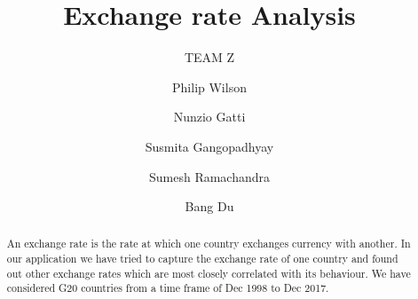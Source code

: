\documentclass[acmtog,authorversion]{acmart}
\begin{document}
\title{Exchange rate Analysis} 

 \subtitle{TEAM Z}


\author{Philip Wilson}

\author{Nunzio Gatti}

\author{Susmita Gangopadhyay} 

\author{Sumesh Ramachandra}

\author{Bang Du}



\begin{abstract}
An exchange rate is the rate at which one country exchanges currency with another.  In our application we have tried to capture the exchange rate of one country and found out other exchange rates which are most closely correlated with its behaviour.  We have considered G20 countries from a time frame of Dec 1998 to Dec 2017.
\end{abstract}










\maketitle



\end{document}
